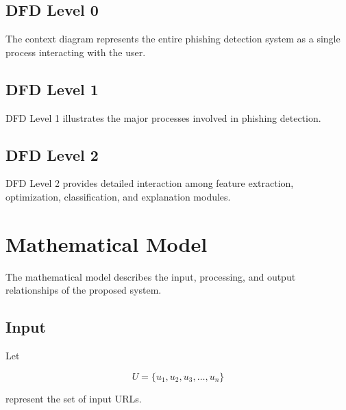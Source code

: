 \documentclass[12pt]{report}
\begin{document}
\subsection{DFD Level 0}

The context diagram represents the entire phishing detection system as a single process interacting with the user.


\subsection{DFD Level 1}

DFD Level 1 illustrates the major processes involved in phishing detection.


\subsection{DFD Level 2}

DFD Level 2 provides detailed interaction among feature extraction, optimization, classification, and explanation modules.


\section{Mathematical Model}

The mathematical model describes the input, processing, and output relationships of the proposed system.

\subsection{Input}

Let

\[
U = \{u_1,u_2,u_3,\ldots,u_n\}
\]

represent the set of input URLs.
\end{document}
